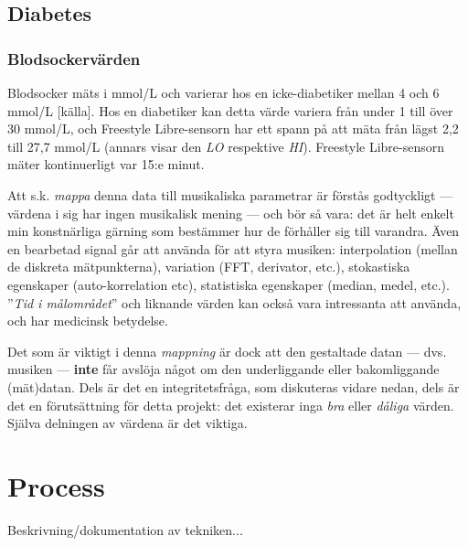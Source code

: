 \documentclass[11pt, twoside, a4paper]{article}
\begin{document}
\begin{multicols}{2}
\subsection*{Diabetes}


\subsubsection*{Blodsockervärden}
Blodsocker mäts i mmol/L och varierar hos en icke-diabetiker mellan 4 och 6 mmol/L [källa]. Hos en diabetiker kan detta värde variera från under 1 till över 30 mmol/L, och Freestyle Libre-sensorn har ett spann på att mäta från lägst 2,2 till 27,7 mmol/L (annars visar den \emph{LO} respektive \emph{HI}). Freestyle Libre-sensorn mäter kontinuerligt var 15:e minut.

Att s.k. \emph{mappa} denna data till musikaliska parametrar är förstås godtyckligt --- värdena i sig har ingen musikalisk mening --- och bör så vara: det är helt enkelt min konstnärliga gärning som bestämmer hur de förhåller sig till varandra. Även en bearbetad signal går att använda för att styra musiken: interpolation (mellan de diskreta mätpunkterna), variation (FFT, derivator, etc.), stokastiska egenskaper (auto-korrelation etc), statistiska egenskaper (median, medel, etc.). ''\emph{Tid i målområdet}'' och liknande värden kan också vara intressanta att använda, och har medicinsk betydelse.

Det som är viktigt i denna \emph{mappning} är dock att den gestaltade datan --- dvs. musiken --- \textbf{inte} får avslöja något om den underliggande eller bakomliggande (mät)datan. Dels är det en integritetsfråga, som diskuteras vidare nedan, dels är det en förutsättning för detta projekt: det existerar inga \emph{bra} eller \emph{dåliga} värden. Själva delningen av värdena är det viktiga.


\section*{Process}
Beskrivning/dokumentation av tekniken...


\end{multicols}
\end{document}
